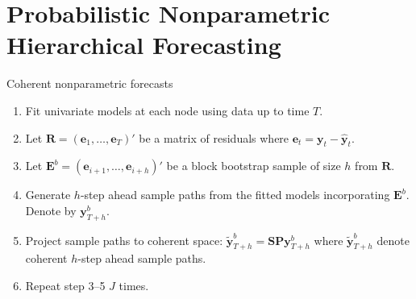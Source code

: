 \documentclass[14pt]{beamer}
\def\bS{\bm{S}}
\def\by{\bm{y}}
\begin{document}
\section{Probabilistic Nonparametric Hierarchical Forecasting}


\begin{frame}{Coherent nonparametric forecasts}
\begin{enumerate}
  \item Fit univariate models at each node using data up to time $T$.
  \item Let $\bm{R} = (\bm{e}_1,\dots,\bm{e}_T)'$ be a matrix of residuals where $\bm{e}_t=\bm{y}_t-\hat{\bm{y}}_t$.
  \item Let $\bm{E}^b = (\bm{e}_{i+1},\dots,\bm{e}_{i+h})'$ be a block bootstrap sample of size $h$ from $\bm{R}$.
  \item Generate $h$-step ahead sample paths from the fitted models incorporating $\bm{E}^b$. Denote by $\bm{y}_{T+h}^b$.
  \item Project sample paths to coherent space: $\tilde{\bm{y}}_{T+h}^b = \bS\bm{P}\by_{T+h}^b$ where $\tilde{\bm{y}}_{T+h}^b$ denote coherent $h$-step ahead sample paths.
  \item Repeat step 3--5 $J$ times.
\end{enumerate}
\end{frame}
\end{document}
